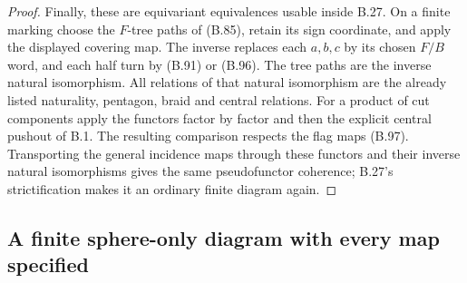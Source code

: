 \begin{proof}
Finally, these are equivariant equivalences usable inside
B.27.  On a finite marking choose the $F$-tree paths of
(B.85), retain its sign coordinate, and apply the displayed
covering map.  The inverse replaces each $a,b,c$ by its
chosen $F/B$ word, and each half turn by (B.91) or (B.96).
The tree paths are the inverse natural isomorphism.  All
relations of that natural isomorphism are the already
listed naturality, pentagon, braid and central relations.
For a product of cut components apply the functors factor
by factor and then the explicit central pushout of B.1.
The resulting comparison respects the flag maps (B.97).
Transporting the general incidence maps through these
functors and their inverse natural isomorphisms gives the
same pseudofunctor coherence; B.27's strictification makes
it an ordinary finite diagram again.
\end{proof}

\subsection{A finite sphere-only diagram with every map specified}

